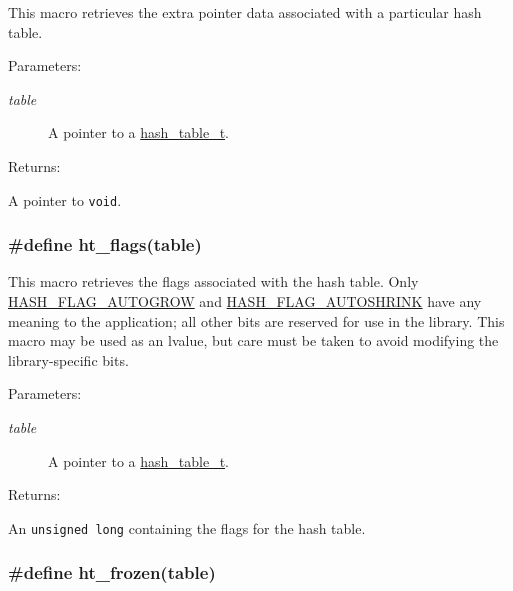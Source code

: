 This macro retrieves the extra pointer data associated with a particular hash table.\begin{Desc}
\item[Parameters: ]\par
\begin{description}
\item[{\em 
table}]A pointer to a \hyperlink{group__dbprim__hash_a0}{hash\_\-table\_\-t}.\end{description}
\end{Desc}
\begin{Desc}
\item[Returns: ]\par
A pointer to {\tt void}. \end{Desc}
\hypertarget{group__dbprim__hash_a20}{
\subsubsection[ht\_\-flags]{\setlength{\rightskip}{0pt plus 5cm}\#define ht\_\-flags(table)}}
\label{group__dbprim__hash_a20}


This macro retrieves the flags associated with the hash table. Only \hyperlink{group__dbprim__hash_a16}{HASH\_\-FLAG\_\-AUTOGROW} and \hyperlink{group__dbprim__hash_a17}{HASH\_\-FLAG\_\-AUTOSHRINK} have any meaning to the application; all other bits are reserved for use in the library. This macro may be used as an lvalue, but care must be taken to avoid modifying the library-specific bits.\begin{Desc}
\item[Parameters: ]\par
\begin{description}
\item[{\em 
table}]A pointer to a \hyperlink{group__dbprim__hash_a0}{hash\_\-table\_\-t}.\end{description}
\end{Desc}
\begin{Desc}
\item[Returns: ]\par
An {\tt unsigned long} containing the flags for the hash table. \end{Desc}
\hypertarget{group__dbprim__hash_a21}{
\subsubsection[ht\_\-frozen]{\setlength{\rightskip}{0pt plus 5cm}\#define ht\_\-frozen(table)}}
\label{group__dbprim__hash_a21}


